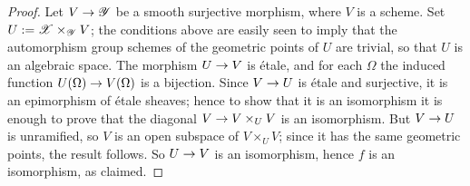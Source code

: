 \documentclass[a4paper, 10pt]{amsart}
\numberwithin{equation}{section}
\numberwithin{subsection}{section}
\theoremstyle{definition}
\theoremstyle{remark}
\renewcommand{\mathcal}{\mathscr}
\newcommand\cY{\mathcal{Y}} \newcommand\cZ{\mathcal{Z}}
\newcommand\arr{\ifinner\to\else\longrightarrow\fi}
\begin{document}
	\begin{proof}
		Let $V \arr \cY$ be a smooth surjective morphism, where $V$ is a scheme. Set $U := \cX\times_{\cY} V$; the conditions above are easily seen to imply that the automorphism group schemes of the geometric points of $U$ are trivial, so that $U$ is an algebraic space. The morphism $U \arr V$ is \'{e}tale, and for each $\Omega$ the induced function $U(\Omega) \arr V(\Omega)$ is a bijection. Since $V \arr U$ is \'{e}tale and surjective, it is an epimorphism of \'{e}tale sheaves; hence to show that it is an isomorphism it is enough to prove that the diagonal $V \arr V\times_{U}V$ is an isomorphism. But $V \arr U$ is unramified, so $V$ is an open subspace of $V\times_{U}V$; since it has the same geometric points, the result follows. So $U \arr V$ is an isomorphism, hence $f$ is an isomorphism, as claimed.
	\end{proof}
	
\end{document}
